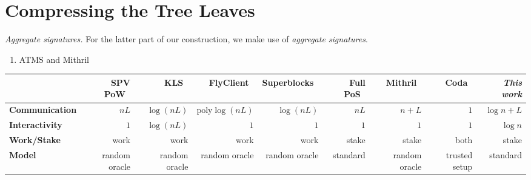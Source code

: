 \section{Compressing the Tree Leaves}\label{sec.compression}

\noindent
\emph{Aggregate signatures.}
For the latter part of our construction, we make use of \emph{aggregate signatures}.

\begin{enumerate}
  \item ATMS and Mithril
\end{enumerate}

\begin{table*}[t]
  \centering
  \begin{tabular}{|l|r|r|r|r|r|r|r|r|}
  \hline
  \multicolumn{1}{|r|}{}                         & \textbf{SPV PoW}~\cite{backbone} & \textbf{KLS}~\cite{popow}        & \textbf{FlyClient}~\cite{flyclient}   & \textbf{Superblocks}~\cite{nipopows,logspace} & \textbf{Full PoS}~\cite{ouroboros} & \textbf{Mithril}~\cite{mithril} & \textbf{Coda}~\cite{coda}  & \textit{This work}         \\ \hline
  \textbf{Communication}                         & $nL$                             & $\log(nL)$                       & $\text{poly}\log(nL)$                 & $\log(nL)$                                    & $nL$                               & $n + L$                         & $1$                        & $\log n + L$               \\ \hline
  \textbf{Interactivity}                         & $1$                              & $\log(nL)$                       & $1$                                   & $1$                                           & $1$                                & $1$                             & $1$                        & $\log n$                   \\ \hline
  \textbf{Work/Stake}                            & work                             & work                             & work                                  & work                                          & stake                              & stake                           & both                       & stake                      \\ \hline
  \textbf{Model}                                 & random oracle                    & random oracle                    & random oracle                         & random oracle                                 & standard                           & random oracle                   & trusted setup              & standard                   \\ \hline

\end{tabular}
\end{table*}
